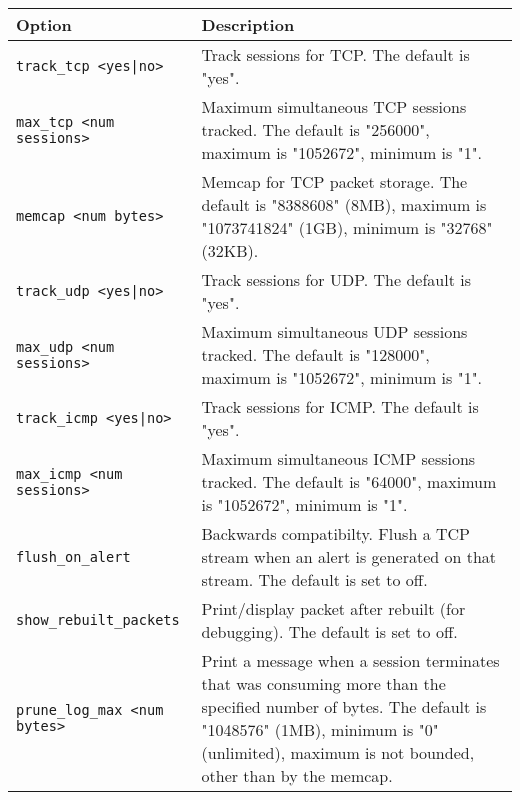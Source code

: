 \documentclass[english]{report}
\begin{document}
\begin{center}
\begin{tabular}{| l | p{4.5in} |}

\hline
\textbf{Option} & \textbf{Description}\\
\hline 

\hline 
\texttt{track\_tcp <yes|no>} &

Track sessions for TCP.  The default is "yes".\\

\hline
\texttt{max\_tcp <num sessions>} &

Maximum simultaneous TCP sessions tracked.  The default is "256000", maximum is
"1052672", minimum is "1".\\

\hline
\texttt{memcap <num bytes>} &

Memcap for TCP packet storage.  The default is "8388608" (8MB), maximum is
"1073741824" (1GB), minimum is "32768" (32KB).\\

\hline
\texttt{track\_udp <yes|no>} &

Track sessions for UDP.  The default is "yes".\\

\hline
\texttt{max\_udp <num sessions>} &

Maximum simultaneous UDP sessions tracked.  The default is "128000", maximum is
"1052672", minimum is "1".\\

\hline
\texttt{track\_icmp <yes|no>} &

Track sessions for ICMP.  The default is "yes".\\

\hline
\texttt{max\_icmp <num sessions>} &

Maximum simultaneous ICMP sessions tracked.  The default is "64000", maximum is
"1052672", minimum is "1".\\

\hline
\texttt{flush\_on\_alert} &

Backwards compatibilty.  Flush a TCP stream when an alert is generated on that
stream.  The default is set to off.\\

\hline
\texttt{show\_rebuilt\_packets} &

Print/display packet after rebuilt (for debugging).  The default is set to
off.\\

\hline
\texttt{prune\_log\_max <num bytes>} &

Print a message when a session terminates that was consuming more than the
specified number of bytes.  The default is "1048576" (1MB), minimum is "0"
(unlimited), maximum is not bounded, other than by the memcap.\\

\hline
\end{tabular}
\end{center}
\end{document}
